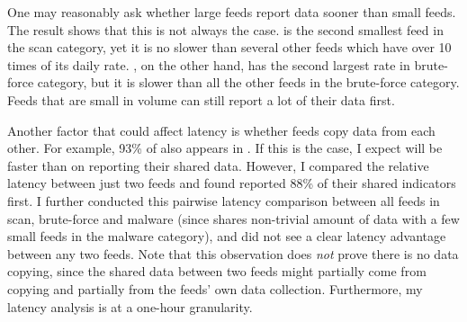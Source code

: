 
One may reasonably ask whether large feeds report data sooner than small feeds.
The result shows that this is not always the case. {\feedFBBasecamp} is the second smallest
feed in the scan category, yet it is no slower than several other feeds which have over 10 times of its daily rate.
{\feedbadipbot}, on the other hand, has the second largest rate in brute-force
category, but it is slower than all the other feeds in the brute-force category. Feeds that are small in volume can still report a lot of their data first.


Another factor that could affect latency is whether feeds copy data from each other. For example, 93\% of {\feeddangerrule} also appears in {\feedbadipssh}. If this is the case, I expect {\feeddangerrule} will be faster than {\feedbadipssh} on
reporting their shared data. However, I compared the relative latency between just two feeds and found {\feedbadipssh} reported 88\% of their shared indicators first.
I further conducted this pairwise latency comparison between all feeds in scan, brute-force
and malware (since {\feedetiprep} shares non-trivial amount of data with a
few small feeds in the malware category), and did not see a clear latency advantage between
any two feeds. Note that this observation does \emph{not} prove there is no data
copying, since the shared data between two feeds might partially come from copying and partially from the feeds' own data collection. Furthermore, my latency analysis is at a one-hour granularity.
